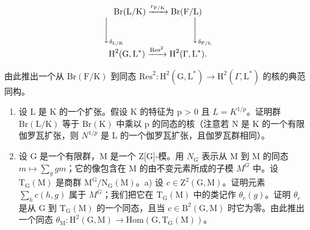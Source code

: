 \[
\begin{array}{c} \operatorname{Br} (\mathrm{L} / \mathrm{K}) \xrightarrow {r _ {\mathrm{F} / \mathrm{K}}} \operatorname{Br} (\mathrm{F} / \mathrm{L}) \\ \Biggl \downarrow_ {\delta_ {\mathrm{L} / \mathrm{K}}} \qquad \qquad \qquad \qquad \Biggl \downarrow_ {\delta_ {\mathrm{F} / \mathrm{L}}} \\ \operatorname{H} ^ {2} (\operatorname{G}, \operatorname{L} ^ {*}) \xrightarrow {\operatorname{Res} ^ {2}} \operatorname{H} ^ {2} (\Gamma , \operatorname{L} ^ {*}). \end{array}
\]

由此推出一个从 \(\mathrm{Br}(\mathrm{F}/\mathrm{K})\) 到同态 \(\mathrm{Res}^{2}:\mathrm{H}^{2}(\mathrm{G},\mathrm{L}^{*})\to\mathrm{H}^{2}(\Gamma,\mathrm{L}^{*})\) 的核的典范同构。

\begin{enumerate}
\def\labelenumi{\arabic{enumi})}
\setcounter{enumi}{7}
\item
  设 L 是 K 的一个扩张。假设 K 的特征为 p \textgreater{} 0 且 \(L = K^{1/p}\)。证明群 \(\mathrm{Br}(\mathrm{L}/\mathrm{K})\) 等于 \(\mathrm{Br}(\mathrm{K})\) 中乘以 p 的同态的核（注意若 N 是 K 的一个有限伽罗瓦扩张，则 \(N^{1/p}\) 是 L 的一个伽罗瓦扩张，且伽罗瓦群相同）。
\item
  设 G 是一个有限群，M 是一个 Z{[}G{]}-模。用 \(N_{G}\) 表示从 M 到 M 的同态 \(m \mapsto \sum_{g} gm\)；它的像包含在 M 的由不变元素所成的子模 \(M^{G}\) 中。设 \(\mathrm{T}_{\mathrm{G}}(\mathrm{M})\) 是商群 \(\mathrm{M}^{\mathrm{G}}/\mathrm{N}_{\mathrm{G}}(\mathrm{M})\)。a) 设 \(c \in \mathrm{Z}^{2}(\mathrm{G}, \mathrm{M})\)。证明元素 \(\sum_{h} c(h, g)\) 属于 \(M^{G}\)；我们把它在 \(\mathrm{T}_{\mathrm{G}}(\mathrm{M})\) 中的类记作 \(\theta_{c}(g)\)。证明 \(\theta_{c}\) 是从 G 到 \(\mathrm{T}_{\mathrm{G}}(\mathrm{M})\) 的一个同态，且当 \(c \in \mathrm{B}^{2}(\mathrm{G}, \mathrm{M})\) 时它为零。由此推出一个同态 \(\theta_{\mathrm{M}} : \mathrm{H}^{2}(\mathrm{G}, \mathrm{M}) \to \mathrm{Hom}(\mathrm{G}, \mathrm{T}_{\mathrm{G}}(\mathrm{M}))\)。
\end{enumerate}

